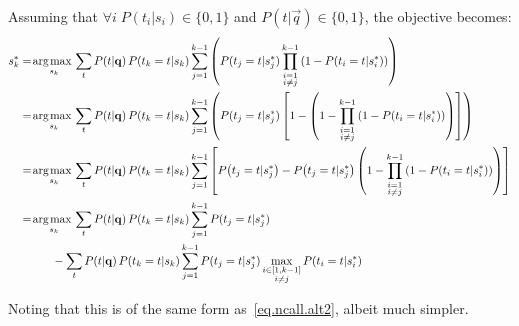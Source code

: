 \noindent
Assuming that $\forall i \; P(t_i|s_i) \in \{0,1\}$ and $P(t|\vec{q}) \in \{0,1\}$, the objective becomes:
\begin{align}
  s_k^* & = \argmax_{s_k} \sum_t P(t|\vec{q}) \, P(t_k = t | s_k) \sum_{j=1}^{k-1} \left( P(t_j=t|s_j^*) \prod_{\substack{i=1 \\ i \neq j}}^{k-1} \left( 1 - P \! \left( t_i=t|s_i^* \right) \right) \right) \nonumber \\
  & = \argmax_{s_k} \sum_t P(t|\vec{q}) \, P(t_k = t | s_k) \sum_{j=1}^{k-1} \left( P(t_j=t|s_j^*) \left[ 1 - \left( 1 - \prod_{\substack{i=1 \\ i \neq j}}^{k-1} \left( 1 - P \! \left( t_i=t|s_i^* \right) \right) \right) \right] \right) \nonumber \\
  & = \argmax_{s_k} \sum_t P(t|\vec{q}) \, P(t_k = t | s_k) \sum_{j=1}^{k-1} \left[ P \! \left( t_j=t|s_j^* \right) - P \! \left( t_j=t|s_j^* \right) \left( 1 - \prod_{\substack{i=1 \\ i \neq j}}^{k-1} \left( 1 - P \! \left( t_i=t|s_i^* \right) \right) \right) \right] \nonumber \\
  & = \argmax_{s_k} \sum_t P(t|\vec{q}) \, P(t_k = t | s_k) \sum_{j=1}^{k-1} P(t_j=t|s_j^*) \nonumber \\
  & \hspace{10mm} - \sum_t P(t|\vec{q}) \, P(t_k = t | s_k) \sum_{j=1}^{k-1} P(t_j=t|s_j^*) \max_{\substack{ i \in [1, k-1] \\ i \neq j}} P(t_i=t|s_i^*) \nonumber
\end{align}

\noindent
Noting that this is of the same form as~\eqref{eq.ncall.alt2}, albeit much simpler.